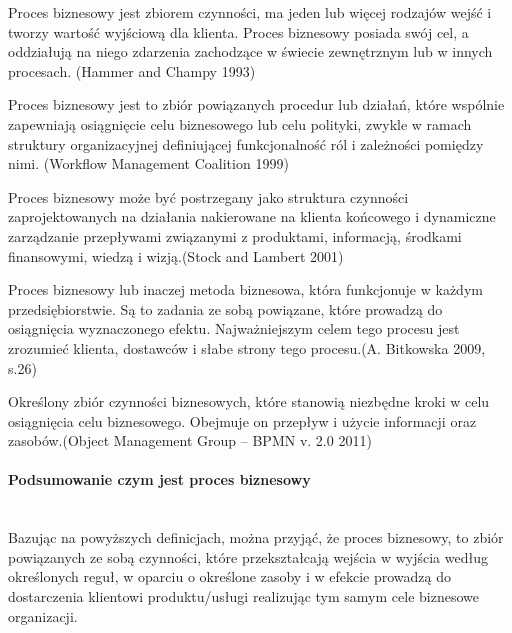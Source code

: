 \documentclass[a4paper, 12pt]{article}
\begin{document}
\hspace*{1 cm}Proces biznesowy jest zbiorem czynności, ma jeden lub więcej rodzajów wejść i tworzy wartość wyjściową dla klienta. Proces biznesowy posiada swój cel, a oddziałują na niego zdarzenia zachodzące w świecie zewnętrznym lub w innych procesach.
(Hammer and Champy 1993)

\hspace*{1 cm} Proces biznesowy jest to zbiór powiązanych procedur lub działań, które wspólnie zapewniają osiągnięcie celu biznesowego lub celu polityki, zwykle w ramach struktury organizacyjnej definiującej funkcjonalność ról i zależności pomiędzy nimi. (Workflow Management Coalition 1999) 

\hspace*{1 cm}Proces biznesowy może być postrzegany jako struktura czynności zaprojektowanych na działania nakierowane na klienta końcowego i dynamiczne zarządzanie przepływami związanymi z produktami, informacją, środkami finansowymi, wiedzą i wizją.(Stock and Lambert 2001)        

\hspace*{1 cm}Proces biznesowy lub inaczej metoda biznesowa, która funkcjonuje w każdym przedsiębiorstwie. Są to zadania ze sobą powiązane, które prowadzą do osiągnięcia wyznaczonego efektu. Najważniejszym celem tego procesu jest zrozumieć klienta, dostawców i słabe strony tego procesu.(A. Bitkowska 2009, s.26)

\hspace*{1 cm}Określony zbiór czynności biznesowych, które stanowią niezbędne kroki w celu osiągnięcia celu biznesowego. Obejmuje on przepływ i użycie informacji oraz zasobów.(Object Management Group – BPMN v. 2.0 2011) 
\paragraph{Podsumowanie czym jest proces biznesowy}\mbox{}\\
\hspace*{1 cm} Bazując na powyższych definicjach, można przyjąć, że proces biznesowy, to zbiór powiązanych ze sobą czynności, które przekształcają wejścia w wyjścia według określonych reguł, w oparciu o określone zasoby i w efekcie prowadzą do dostarczenia klientowi produktu/usługi realizując tym samym cele biznesowe organizacji.
\end{document}
